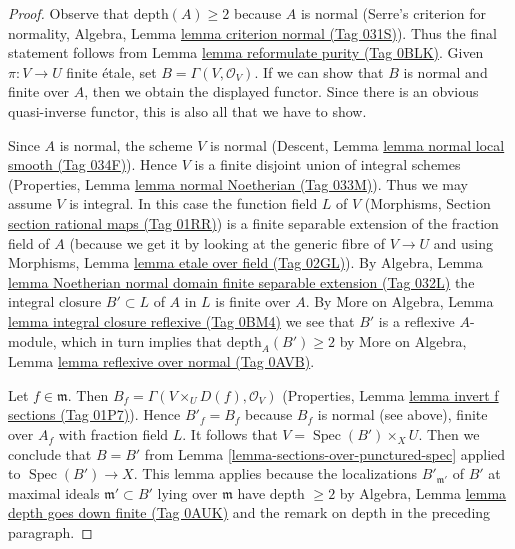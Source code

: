 \documentclass{amsart}
\theoremstyle{plain}
\theoremstyle{definition}
\theoremstyle{remark}
\numberwithin{equation}{subsection}
\def\Spec{\mathop{\mathrm{Spec}}}
\begin{document}
\begin{proof}
Observe that $\text{depth}(A) \geq 2$ because $A$ is normal
(Serre's criterion for normality, Algebra, Lemma
\href{https://stacks.math.columbia.edu/tag/031S}{lemma criterion normal (Tag 031S)}).
Thus the final statement follows from Lemma \href{https://stacks.math.columbia.edu/tag/0BLK}{lemma reformulate purity (Tag 0BLK)}.
Given $\pi : V \to U$ finite \'etale, set $B = \Gamma(V, \mathcal{O}_V)$.
If we can show that $B$ is normal and finite over $A$, then
we obtain the displayed functor. Since there is an obvious
quasi-inverse functor, this is also all that we have to show.

\medskip\noindent
Since $A$ is normal, the scheme $V$ is normal
(Descent, Lemma \href{https://stacks.math.columbia.edu/tag/034F}{lemma normal local smooth (Tag 034F)}).
Hence $V$ is a finite disjoint union of integral schemes
(Properties, Lemma \href{https://stacks.math.columbia.edu/tag/033M}{lemma normal Noetherian (Tag 033M)}).
Thus we may assume $V$ is integral.
In this case the function field $L$ of $V$
(Morphisms, Section \href{https://stacks.math.columbia.edu/tag/01RR}{section rational maps (Tag 01RR)})
is a finite separable extension of the fraction field of $A$
(because we get it by looking at the generic fibre
of $V \to U$ and using Morphisms, Lemma
\href{https://stacks.math.columbia.edu/tag/02GL}{lemma etale over field (Tag 02GL)}).
By Algebra, Lemma
\href{https://stacks.math.columbia.edu/tag/032L}{lemma Noetherian normal domain finite separable extension (Tag 032L)}
the integral closure $B' \subset L$ of $A$ in $L$ is finite over $A$.
By More on Algebra, Lemma \href{https://stacks.math.columbia.edu/tag/0BM4}{lemma integral closure reflexive (Tag 0BM4)}
we see that $B'$ is a reflexive $A$-module, which in turn implies
that $\text{depth}_A(B') \geq 2$ by
More on Algebra, Lemma \href{https://stacks.math.columbia.edu/tag/0AVB}{lemma reflexive over normal (Tag 0AVB)}.

\medskip\noindent
Let $f \in \mathfrak m$. Then $B_f = \Gamma(V \times_U D(f), \mathcal{O}_V)$
(Properties, Lemma \href{https://stacks.math.columbia.edu/tag/01P7}{lemma invert f sections (Tag 01P7)}).
Hence $B'_f = B_f$ because $B_f$ is normal (see above),
finite over $A_f$ with fraction field $L$.
It follows that $V = \Spec(B') \times_X U$.
Then we conclude that $B = B'$ from
Lemma \ref{lemma-sections-over-punctured-spec}
applied to $\Spec(B') \to X$.
This lemma applies because the localizations $B'_{\mathfrak m'}$
of $B'$ at maximal ideals $\mathfrak m' \subset B'$ lying over
$\mathfrak m$ have depth $\geq 2$ by
Algebra, Lemma \href{https://stacks.math.columbia.edu/tag/0AUK}{lemma depth goes down finite (Tag 0AUK)}
and the remark on depth in the preceding paragraph.
\end{proof}
\end{document}

